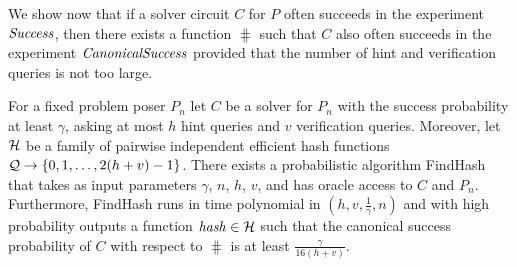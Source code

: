 We show now that if a solver circuit $C$ for $P$ often succeeds in the experiment $\operatorname{\mathit{Success}}$,
then there exists a function $\hash$ such that $C$ also often succeeds in the experiment $\operatorname{\mathit{CanonicalSuccess}}$
provided that the number of hint and verification queries is not too large.
%
\begin{lemma}
\label{lemma:hash_function_probability}
For a fixed problem poser $P_n$ let $C$ be a solver for $P_n$ with the success probability at least $\gamma$,
asking at most $h$ hint queries and $v$ verification queries.
Moreover, let $\mathcal{H}$ be a family of pairwise independent efficient hash functions $\mathcal{Q} \rightarrow \{0,1, \dots,2(h+v)-1\}$.
There exists a probabilistic algorithm FindHash that takes as input parameters $\gamma$, $n$, $h$, $v$, and has oracle access to $C$ and $P_n$.
Furthermore, FindHash runs in time polynomial in $(h,v,\frac{1}{\gamma},n)$ and with high probability outputs a function $\operatorname{\mathit{hash}} \in \mathcal{H}$
such that the canonical success probability of $C$ with respect to $\hash$ is at least $\frac{\gamma}{16(h+v)}$.
\end{lemma}
%
